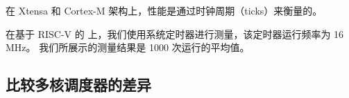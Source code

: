 在 Xtensa 和 Cortex-M 架构上，性能是通过时钟周期（ticks）来衡量的。
\iffalse
\begin{itemize}
    \item Cortex-M: SysTick timer with the processor clock as the clock source
    \item Xtensa: CCOUNT cycle count registers
\end{itemize}
\fi
在基于 RISC-V 的 \espcthree{} 上，我们使用系统定时器进行测量，该定时器运行频率为 16 MHz。
我们所展示的测量结果是 1000 次运行的平均值。



\subsection{比较多核调度器的差异}


